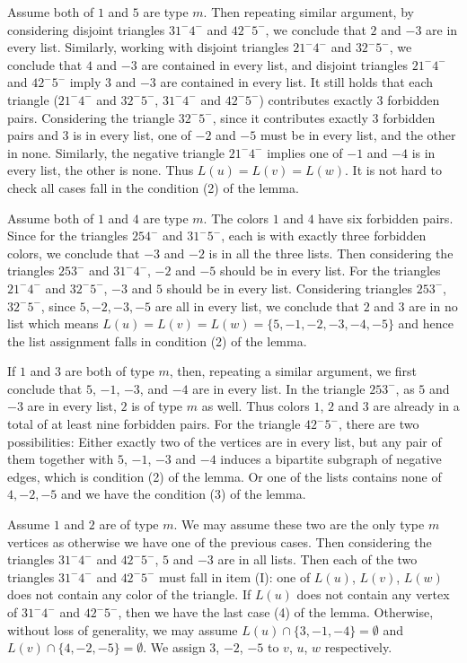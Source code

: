 \documentclass[11pt,a4paper]{article}
\makeatletter
\renewenvironment{proof}[1][\proofname]{\par
	\pushQED{\qed}%
	\normalfont \topsep6\p@\@plus6\p@\relax
	\trivlist
	\item[\hskip\labelsep
	\bfseries
	#1\@addpunct{.}]\ignorespaces
}{%
	\popQED\endtrivlist\@endpefalse
}
\theoremstyle{definition}
\makeatother
\begin{document}
\begin{proof}
		
		Assume both of $1$ and $5$ are type $m$. Then repeating similar argument, by considering disjoint triangles $31^{-}4^{-}$ and $42^{-}5^{-}$,  we conclude that $2$ and $-3$ are in every list. Similarly, working with disjoint triangles $21^{-}4^{-}$ and $32^{-}5^{-}$,  we conclude that $4$ and $-3$ are contained in every list, and disjoint triangles $21^{-}4^{-}$ and $42^{-}5^{-}$ imply $3$ and $-3$ are contained in every list.  It still holds that each triangle ($21^{-}4^-$ and $32^{-}5^{-}$, $31^{-}4^-$ and $42^{-}5^{-}$) contributes exactly 3 forbidden pairs. 
		Considering the triangle $32^{-}5^{-}$, since it contributes exactly 3 forbidden pairs and $3$ is in every list, one of $-2$ and $-5$ must be in every list, and the other in none. Similarly, the negative triangle $21^{-}4^{-}$ implies one of $-1$ and $-4$ is in every list, the other is none.  Thus $L(u)=L(v)=L(w)$. It is not hard to check all cases fall in the condition (2) of the lemma.   
		
		Assume both of $1$ and $4$ are type $m$. The colors $1$ and $4$ have six forbidden pairs.  Since for the triangles $254^-$ and $31^-5^-$, each is with exactly three forbidden colors, we conclude that $-3$ and $-2$ is in all the three lists.  Then considering the triangles  $253^-$ and $31^-4^-$, $-2$ and $-5$ should be in every list. For the triangles  $21^{-}4^-$ and $32^-5^-$, $-3$ and $5$ should be in every list. Considering triangles $253^-$, $32^-5^-$,  since $5, -2, -3, -5$ are all in every list, we conclude that $2$ and $3$ are in no list which means $L(u)=L(v)=L(w)=\{5,-1,-2,-3,-4,-5\}$ and hence the list assignment falls in condition (2) of the lemma.
		
		
		If $1$ and $3$ are both of type $m$, then, repeating a similar argument, we first conclude that $5$, $-1$, $-3$, and $-4$ are in every list. In the triangle $253^{-}$, as $5$ and $-3$ are in every list,  $2$ is of type $m$ as well. Thus colors $1$, $2$ and $3$ are already in a total of at least nine forbidden pairs. For the triangle $42^-5^-$, there are two possibilities: Either exactly two of the vertices are in every list, but any pair of them together with  $5$, $-1$, $-3$ and $-4$ induces a bipartite subgraph of negative edges, which is condition (2) of the lemma. Or one of the lists contains none of $4, -2, -5$ and we have the condition (3) of the lemma. 
		
		Assume $1$ and $2$ are of type $m$. We may assume these two are the only type $m$ vertices as otherwise we have one of the previous cases. Then considering the triangles $31^{-}4^{-}$ and $42^{-}5^{-}$, $5$ and $-3$ are in all lists. Then each of the two triangles $31^-4^-$  and $42^-5^-$ must fall in item (I): one of $L(u)$, $L(v)$, $L(w)$ does not contain any color of the triangle. If $L(u)$ does not contain any  vertex of $31^-4^-$ and $42^-5^-$, then we have the last case (4) of the lemma. Otherwise, without loss of generality, we may assume $L(u)\cap \{3,-1,-4\}=\emptyset$ and $L(v)\cap \{4,-2,-5\}=\emptyset$. We assign $3$, $-2$, $-5$ to $v$, $u$, $w$ respectively. 
		

\end{proof}
\end{document}
